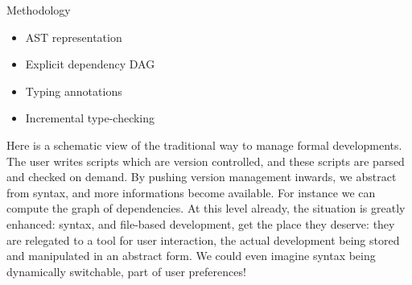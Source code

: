 \documentclass[ignorenonframetext,red]{beamer}
\begin{document}
\begin{frame}{Methodology}
  \begin{center}
  \end{center}
  \begin{itemize}
  \item<4-> AST representation
  \item<5-> Explicit dependency DAG
  \item<7-> Typing annotations
  \item<8-> Incremental type-checking
  \end{itemize}
\end{frame}

Here is a schematic view of the traditional way to manage formal
developments. The user writes scripts which are version controlled,
and these scripts are parsed and checked on demand. By pushing version
management inwards, we abstract from syntax, and more informations
become available. For instance we can compute the graph of
dependencies. At this level already, the situation is greatly
enhanced: syntax, and file-based development, get the place they
deserve: they are relegated to a tool for user interaction, the actual
development being stored and manipulated in an abstract form. We could
even imagine syntax being dynamically switchable, part of user
preferences!
\end{document}
